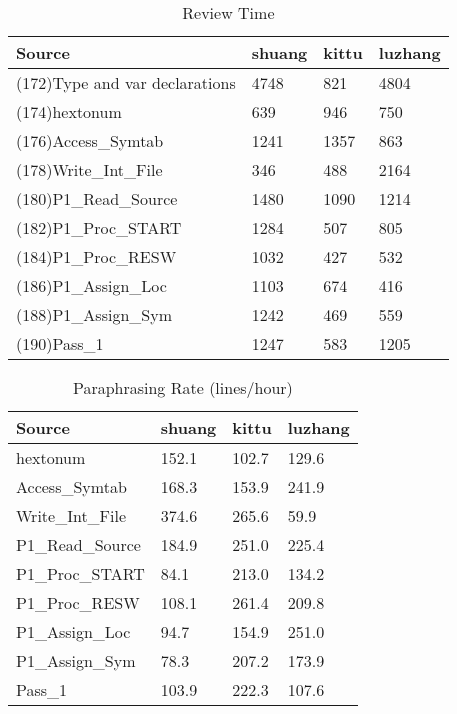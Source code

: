 \begin{table}[hb]
\begin{center}
\begin{tabular}{|l|l|l|l|}
\hline
Source & shuang & kittu & luzhang\\
\hline
(172)Type and var declarations & 4748 & 821 & 4804\\
(174)hextonum & 639 & 946 & 750\\
(176)Access\_Symtab & 1241 & 1357 & 863\\
(178)Write\_Int\_File & 346 & 488 & 2164\\
(180)P1\_Read\_Source & 1480 & 1090 & 1214\\
(182)P1\_Proc\_START & 1284 & 507 & 805\\
(184)P1\_Proc\_RESW & 1032 & 427 & 532\\
(186)P1\_Assign\_Loc & 1103 & 674 & 416\\
(188)P1\_Assign\_Sym & 1242 & 469 & 559\\
(190)Pass\_1 & 1247 & 583 & 1205\\
\hline
\end{tabular}
\end{center}
\caption{Review Time}
\end{table}

\begin{table}[hb]
\begin{center}
\begin{tabular}{|l|l|l|l|}
\hline
Source & shuang & kittu & luzhang\\
\hline
hextonum & 152.1 & 102.7 & 129.6\\
Access\_Symtab & 168.3 & 153.9 & 241.9\\
Write\_Int\_File & 374.6 & 265.6 & 59.9\\
P1\_Read\_Source & 184.9 & 251.0 & 225.4\\
P1\_Proc\_START & 84.1 & 213.0 & 134.2\\
P1\_Proc\_RESW & 108.1 & 261.4 & 209.8\\
P1\_Assign\_Loc & 94.7 & 154.9 & 251.0\\
P1\_Assign\_Sym & 78.3 & 207.2 & 173.9\\
Pass\_1 & 103.9 & 222.3 & 107.6\\
\hline
\end{tabular}
\end{center}
\caption{Paraphrasing Rate (lines/hour)}
\end{table}

